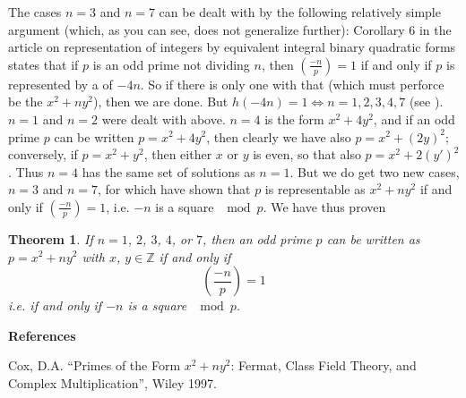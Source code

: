 \documentclass[12pt]{article}
\newcommand{\BZ}{\mathbb{Z}}
\newcommand{\Leg}[2]{\left(\frac{#1}{#2}\right)}
\newtheorem{thm}{Theorem}
\begin{document}
The cases $n=3$ and $n=7$ can be dealt with by the following relatively simple argument (which, as you can see, does not generalize further): Corollary 6 in the article on representation of integers by equivalent integral binary quadratic forms states that if $p$ is an odd prime not dividing $n$, then $\Leg{-n}{p}=1$ if and only if $p$ is represented by a  of  $-4n$. So if there is only one  with that  (which must perforce be the  $x^2+ny^2$), then we are done. But $h(-4n)=1 \iff n=1, 2, 3, 4, 7$ (see ). $n=1$ and $n=2$ were dealt with above. $n=4$ is the form $x^2+4y^2$, and if an odd prime $p$ can be written $p=x^2+4y^2$, then clearly we have also $p=x^2+(2y)^2$; conversely, if $p=x^2+y^2$, then either $x$ or $y$ is even, so that also $p=x^2+2(y')^2$. Thus $n=4$ has the same set of solutions as $n=1$. But we do get two new cases, $n=3$ and $n=7$, for which have shown  that $p$ is representable as $x^2+ny^2$ if and only if $\Leg{-n}{p}=1$, i.e. $-n$ is a square $\mod p$. We have thus proven
\begin{thm} If $n=1$, $2$, $3$, $4$, or $7$, then an odd prime $p$ can be written as $p=x^2+ny^2$ with $x$, $y\in\BZ$ if and only if
\[
 \Leg{-n}{p}=1
\]
i.e. if and only if $-n$ is a square $\mod p$.
\end{thm}


\textbf{References}

Cox, D.A. ``Primes of the Form $x^2 + ny^2$: Fermat, Class Field Theory, and Complex Multiplication'', Wiley 1997.
\end{document}
